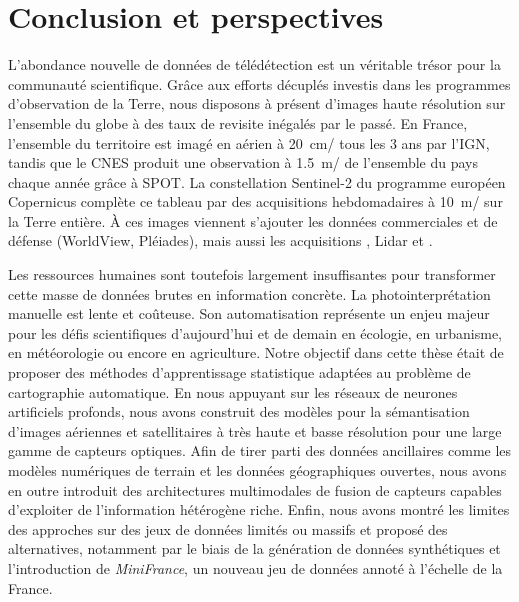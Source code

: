 \chapter{Conclusion et perspectives}
\label{chap:conclusion}
\minitoc

L'abondance nouvelle de données de télédétection est un véritable trésor pour la communauté scientifique. Grâce aux efforts décuplés investis dans les programmes d'observation de la Terre, nous disposons à présent d'images haute résolution sur l'ensemble du globe à des taux de revisite inégalés par le passé. En France, l'ensemble du territoire est imagé en aérien à \SI{20}{\centi\meter/\px} tous les 3 ans par l'\gls{IGN}, tandis que le \gls{CNES} produit une observation à \SI{1,5}{\meter/\px} de l'ensemble du pays chaque année grâce à \gls{SPOT}. La constellation \gls{Sentinel}-2 du programme européen Copernicus complète ce tableau par des acquisitions hebdomadaires à \SI{10}{\meter/\px} sur la Terre entière. À ces images viennent s'ajouter les données commerciales et de défense (WorldView, Pléiades), mais aussi les acquisitions , \gls{Lidar} et .

Les ressources humaines sont toutefois largement insuffisantes pour transformer cette masse de données brutes en information concrète. La photointerprétation manuelle est lente et coûteuse. Son automatisation représente un enjeu majeur pour les défis scientifiques d'aujourd'hui et de demain en écologie, en urbanisme, en météorologie ou encore en agriculture. Notre objectif dans cette thèse était de proposer des méthodes d'apprentissage statistique adaptées au problème de cartographie automatique. En nous appuyant sur les réseaux de neurones artificiels profonds, nous avons construit des modèles pour la sémantisation d'images aériennes et satellitaires à très haute et basse résolution pour une large gamme de capteurs optiques. Afin de tirer parti des données ancillaires comme les modèles numériques de terrain et les données géographiques ouvertes, nous avons en outre introduit des architectures multimodales de fusion de capteurs capables d'exploiter de l'information hétérogène riche. Enfin, nous avons montré les limites des approches sur des jeux de données limités ou massifs et proposé des alternatives, notamment par le biais de la génération de données synthétiques et l'introduction de \emph{MiniFrance}, un nouveau jeu de données annoté à l'échelle de la France.

